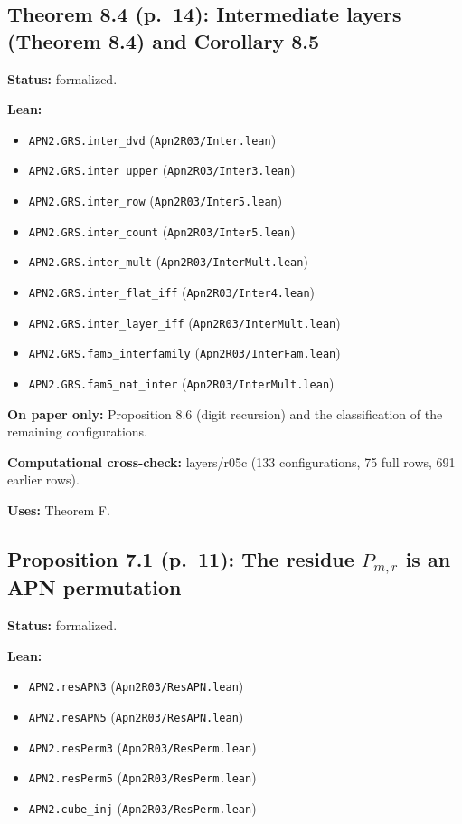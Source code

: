 \documentclass[11pt]{article}
\begin{document}
\subsection*{Theorem 8.4 (p.~14): Intermediate layers (Theorem 8.4) and Corollary 8.5}
\textbf{Status:} formalized.\par
\textbf{Lean:}\begin{itemize}\setlength\itemsep{0pt}
\item \texttt{APN2.GRS.inter\_dvd} \hfill (\texttt{Apn2R03/Inter.lean})
\item \texttt{APN2.GRS.inter\_upper} \hfill (\texttt{Apn2R03/Inter3.lean})
\item \texttt{APN2.GRS.inter\_row} \hfill (\texttt{Apn2R03/Inter5.lean})
\item \texttt{APN2.GRS.inter\_count} \hfill (\texttt{Apn2R03/Inter5.lean})
\item \texttt{APN2.GRS.inter\_mult} \hfill (\texttt{Apn2R03/InterMult.lean})
\item \texttt{APN2.GRS.inter\_flat\_iff} \hfill (\texttt{Apn2R03/Inter4.lean})
\item \texttt{APN2.GRS.inter\_layer\_iff} \hfill (\texttt{Apn2R03/InterMult.lean})
\item \texttt{APN2.GRS.fam5\_interfamily} \hfill (\texttt{Apn2R03/InterFam.lean})
\item \texttt{APN2.GRS.fam5\_nat\_inter} \hfill (\texttt{Apn2R03/InterMult.lean})
\end{itemize}
\textbf{On paper only:} Proposition 8.6 (digit recursion) and the classification of the remaining configurations.\par
\textbf{Computational cross-check:} layers/r05c (133 configurations, 75 full rows, 691 earlier rows).\par
\textbf{Uses:} Theorem F.\par
\subsection*{Proposition 7.1 (p.~11): The residue $P_{m,r}$ is an APN permutation}
\textbf{Status:} formalized.\par
\textbf{Lean:}\begin{itemize}\setlength\itemsep{0pt}
\item \texttt{APN2.resAPN3} \hfill (\texttt{Apn2R03/ResAPN.lean})
\item \texttt{APN2.resAPN5} \hfill (\texttt{Apn2R03/ResAPN.lean})
\item \texttt{APN2.resPerm3} \hfill (\texttt{Apn2R03/ResPerm.lean})
\item \texttt{APN2.resPerm5} \hfill (\texttt{Apn2R03/ResPerm.lean})
\item \texttt{APN2.cube\_inj} \hfill (\texttt{Apn2R03/ResPerm.lean})
\end{itemize}
\end{document}
